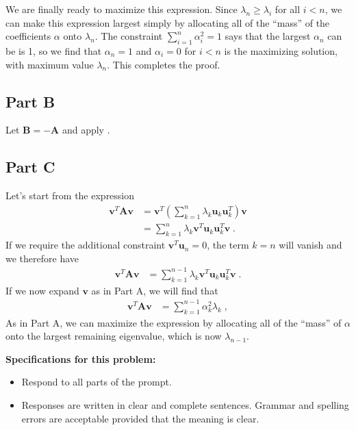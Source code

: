 \documentclass[11pt]{article}
\begin{document}
We are finally ready to maximize this expression. 
Since $\lambda_n \geq \lambda_i$ for all $i < n$, we can make this expression largest simply by allocating all of the ``mass'' of the coefficients $\alpha$ onto $\lambda_n$. 
The constraint $\sum_{i = 1}^n \alpha_i^2 = 1$ says that the largest $\alpha_n$ can be is 1, so we find that $\alpha_n = 1$ and $\alpha_i = 0$ for $i < n$ is the maximizing solution, with maximum value $\lambda_n$. 
This completes the proof. 

\subsection*{Part B}

Let $\mathbf{B} = - \mathbf{A}$ and apply . 

\subsection*{Part C}

Let's start from the expression 
\begin{align*}
    \mathbf{v}^T\mathbf{A}\mathbf{v} &= \mathbf{v}^T \left(\sum_{k = 1}^n \lambda_k\mathbf{u}_k\mathbf{u}_k^T\right) \mathbf{v} \\ 
    &= \sum_{k = 1}^n \lambda_k\mathbf{v}^T\mathbf{u}_k\mathbf{u}_k^T\mathbf{v}\;.
\end{align*}
If we require the additional constraint $\mathbf{v}^T\mathbf{u}_n = 0$, the term $k = n$ will vanish and we therefore have 
\begin{align*}
    \mathbf{v}^T\mathbf{A}\mathbf{v} 
    &= \sum_{k = 1}^{n-1} \lambda_k\mathbf{v}^T\mathbf{u}_k\mathbf{u}_k^T\mathbf{v}\;.
\end{align*}
If we now expand $\mathbf{v}$ as in Part A, we will find that  
\begin{align*}
\mathbf{v}^T\mathbf{A}\mathbf{v}
&= \sum_{k = 1}^{n-1} \alpha_k^2 \lambda_k\;,
\end{align*}
As in Part A, we can maximize the expression by allocating all of the ``mass'' of $\alpha$ onto the largest remaining eigenvalue, which is now $\lambda_{n-1}$. 

\newpage

{\bf Specifications for this problem:}
\begin{itemize}
    \item Respond to all parts of the prompt.
    \item Responses are written in clear and complete sentences. Grammar and spelling errors are acceptable provided that the meaning is clear.
\end{itemize}
\end{document}
